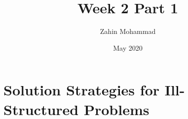 \documentclass{article}
\title{Week 2 Part 1}
\author{Zahin Mohammad}
\date{May 2020}
\begin{document}
\maketitle
\section{Solution Strategies for Ill-Structured Problems}

\printbibliography[title={Referências}]
\end{document}
